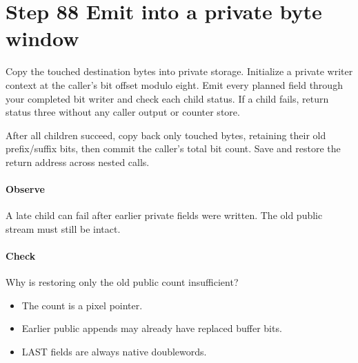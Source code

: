 \section{Step 88 Emit into a private byte window}\label{h263-coeff-s08}
Copy the touched destination bytes into private storage. Initialize a private
writer context at the caller's bit offset modulo eight. Emit every planned field
through your completed bit writer and check each child status. If a child fails,
return status three without any caller output or counter store.

After all children succeed, copy back only touched bytes, retaining their old
prefix/suffix bits, then commit the caller's total bit count. Save and restore
the return address across nested calls.

\paragraph{Observe} A late child can fail after earlier private fields were written.
The old public stream must still be intact.
\paragraph{Check} Why is restoring only the old public count insufficient?
\begin{itemize}
  \item[A.] The count is a pixel pointer.
  \item[B.] Earlier public appends may already have replaced buffer bits.
  \item[C.] LAST fields are always native doublewords.
\end{itemize}
